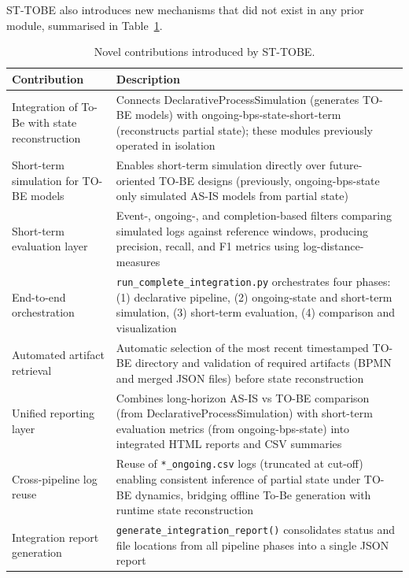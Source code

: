 \documentclass[a4paper,fleqn]{cas-sc}
\begin{document}
ST-TOBE also introduces new mechanisms that did not exist in any
prior module, summarised in Table~\ref{tbl:novel_contributions}.

\begin{table}[width=.95\linewidth,cols=2,pos=t]
\caption{Novel contributions introduced by ST-TOBE.}
\label{tbl:novel_contributions}
\begin{tabular*}{\tblwidth}{@{} p{} p{} @{}}
\toprule
Contribution & Description \\
\midrule
Integration of To-Be with state reconstruction & Connects DeclarativeProcessSimulation (generates TO-BE models) with ongoing-bps-state-short-term (reconstructs partial state); these modules previously operated in isolation \\
Short-term simulation for TO-BE models & Enables short-term simulation directly over future-oriented TO-BE designs (previously, ongoing-bps-state only simulated AS-IS models from partial state) \\
Short-term evaluation layer & Event-, ongoing-, and completion-based filters comparing simulated logs against reference windows, producing precision, recall, and F1 metrics using log-distance-measures \\
End-to-end orchestration & \verb|run_complete_integration.py| orchestrates four phases: (1) declarative pipeline, (2) ongoing-state and short-term simulation, (3) short-term evaluation, (4) comparison and visualization \\
Automated artifact retrieval & Automatic selection of the most recent timestamped TO-BE directory and validation of required artifacts (BPMN and merged JSON files) before state reconstruction \\
Unified reporting layer & Combines long-horizon AS-IS vs TO-BE comparison (from DeclarativeProcessSimulation) with short-term evaluation metrics (from ongoing-bps-state) into integrated HTML reports and CSV summaries \\
Cross-pipeline log reuse & Reuse of \verb|*_ongoing.csv| logs (truncated at cut-off) enabling consistent inference of partial state under TO-BE dynamics, bridging offline To-Be generation with runtime state reconstruction \\
Integration report generation & \verb|generate_integration_report()| consolidates status and file locations from all pipeline phases into a single JSON report \\
\bottomrule
\end{tabular*}
\end{table}
\end{document}

